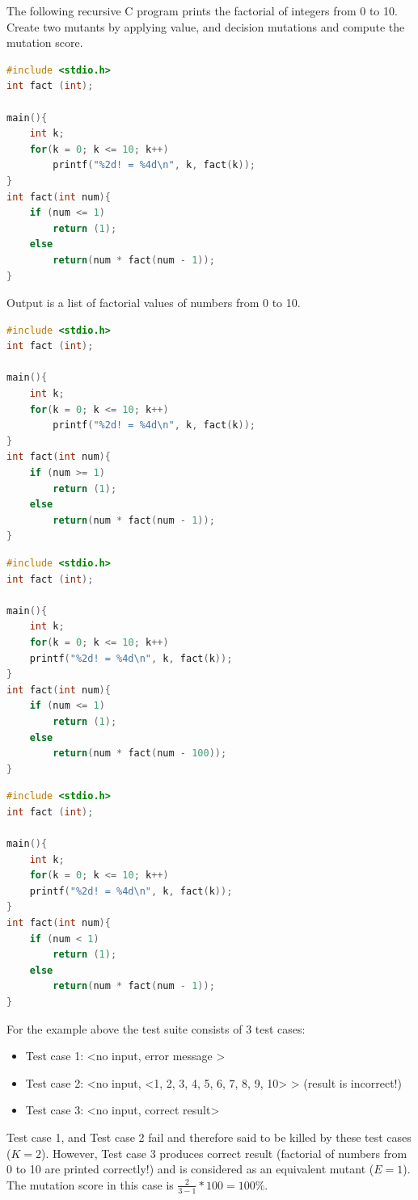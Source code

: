 \begin{exercise}
The following recursive C program prints the factorial of integers from 0 to 10. Create two mutants by applying value, and decision mutations and compute the mutation score.

\begin{lstlisting}[language=C, caption={A recursive C program to compute and print  0!, 1!,\ldots,10!}]
#include <stdio.h>
int fact (int);

main(){
	int k;
	for(k = 0; k <= 10; k++)
		printf("%2d! = %4d\n", k, fact(k));
}
int fact(int num){
	if (num <= 1)
		return (1);
	else
		return(num * fact(num - 1));
}
\end{lstlisting}
Output is a list of factorial values of numbers from 0 to 10.
\begin{lstlisting}[language=C, caption={Mutant 1: (Decision mutation - Change num <= 1 to num < 1)}]
#include <stdio.h>
int fact (int);

main(){
	int k;
	for(k = 0; k <= 10; k++)
		printf("%2d! = %4d\n", k, fact(k));
}
int fact(int num){
	if (num >= 1)
		return (1);
	else
		return(num * fact(num - 1));
}
\end{lstlisting}
\begin{lstlisting}[language=C, caption={Mutant 2: (Value mutation - Change fact(num –  1) to fact(num  - 100))}]
#include <stdio.h>
int fact (int);

main(){
	int k;
	for(k = 0; k <= 10; k++)
	printf("%2d! = %4d\n", k, fact(k));
}
int fact(int num){
	if (num <= 1)
		return (1);
	else
		return(num * fact(num - 100));
}
\end{lstlisting}
\begin{lstlisting}[language=C, caption={Mutant 3: (Decision mutant – Change  if (num <= 1) to if (num < 1))}]
#include <stdio.h>
int fact (int);

main(){
	int k;
	for(k = 0; k <= 10; k++)
	printf("%2d! = %4d\n", k, fact(k));
}
int fact(int num){
	if (num < 1)
		return (1);
	else
		return(num * fact(num - 1));
}
\end{lstlisting}
For the example above the test suite consists of 3 test cases:

\begin{itemize}
    \item Test case 1: <no input, error message >
    \item Test case 2: <no input, <1, 2, 3, 4, 5, 6, 7, 8, 9, 10> > (result is incorrect!)
    \item Test case 3: <no input, correct result>
\end{itemize}

Test case 1, and Test case 2 fail and therefore said to be killed by these test cases ($K=2$). However, Test case 3 produces correct result (factorial of numbers from 0 to 10 are printed correctly!) and is considered as an equivalent mutant ($E=1$). The mutation score in this case is $\frac{2}{3 - 1} * 100 = 100\%$.
\end{exercise}

